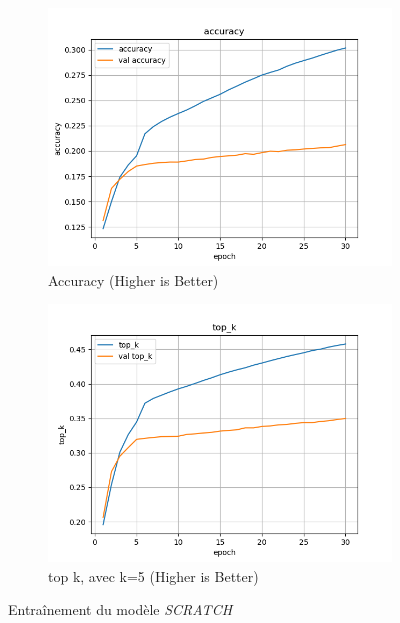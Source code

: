 \documentclass[a4paper]{article}
\begin{document}
\begin{figure}[ht]
  \begin{subfigure}{0.47\textwidth}
    \includegraphics[width=\linewidth]{../logs/learnfromscratch_1/accuracy.png}
    \caption{Accuracy (Higher is Better)}
  \end{subfigure}
  \hfill
  \begin{subfigure}{0.47\textwidth}
    \includegraphics[width=\linewidth]{../logs/learnfromscratch_1/top_k.png}
    \caption{top k, avec k=5 (Higher is Better)}
  \end{subfigure}
  \caption{Entraînement du modèle \textit{SCRATCH}}
  \label{subfig:result model 2}
\end{figure}
\end{document}
